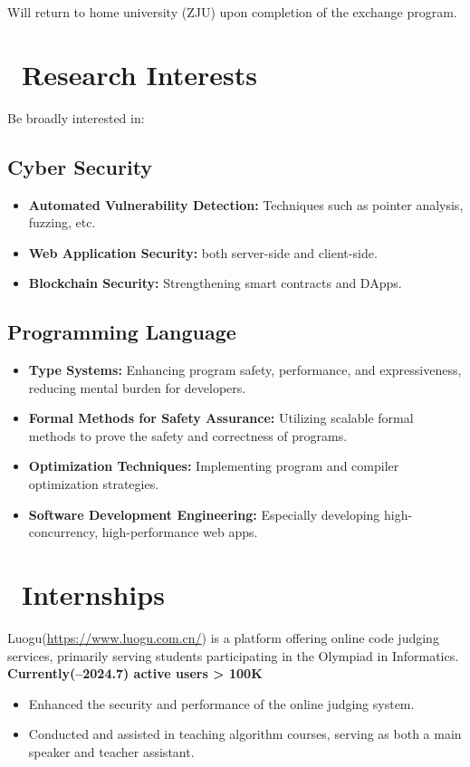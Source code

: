 \documentclass{resume}
\begin{document}
Will return to home university (ZJU) upon completion of the exchange program.

\section{\faLightbulbO\ Research Interests}
Be broadly interested in:
\subsection{Cyber Security}
\begin{itemize}
  \item \textbf{Automated Vulnerability Detection:} Techniques such as pointer analysis, fuzzing, etc.
  \item \textbf{Web Application Security:} both server-side and client-side.
  \item \textbf{Blockchain Security:} Strengthening smart contracts and DApps.
\end{itemize}

\subsection{Programming Language}
\begin{itemize}
  \item \textbf{Type Systems:} Enhancing program safety, performance, and expressiveness, reducing mental burden for developers.
  \item \textbf{Formal Methods for Safety Assurance:} Utilizing scalable formal methods to prove the safety and correctness of programs.
  \item \textbf{Optimization Techniques:} Implementing program and compiler optimization strategies.
  \item \textbf{Software Development Engineering:} Especially developing high-concurrency, high-performance web apps.
\end{itemize}

\section{\faUsers\ Internships}
Luogu(\url{https://www.luogu.com.cn/}) is a platform offering online code judging services, primarily serving students participating in the Olympiad in Informatics.\\
\textbf{Currently(--2024.7) active users > 100K}
\begin{itemize}
  \item Enhanced the security and performance of the online judging system.
  \item Conducted and assisted in teaching algorithm courses, serving as both a main speaker and teacher assistant.
\end{itemize}
\end{document}
